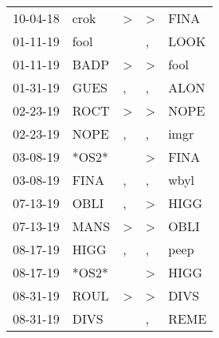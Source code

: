 \begin{supertabular}{p{0.07\textwidth}p{0.06\textwidth}p{0.02\textwidth}p{0.02\textwidth}p{0.06\textwidth}}
          10-04-18\textsuperscript{} &           crok\textsuperscript{} &     \textgreater &     \textgreater &           FINA\textsuperscript{} \\
          01-11-19\textsuperscript{} &           fool\textsuperscript{} &                  &                , &           LOOK\textsuperscript{} \\
          01-11-19\textsuperscript{} &           BADP\textsuperscript{} &     \textgreater &     \textgreater &           fool\textsuperscript{} \\
          01-31-19\textsuperscript{} &           GUES\textsuperscript{} &                , &                , &           ALON\textsuperscript{} \\
          02-23-19\textsuperscript{} &           ROCT\textsuperscript{} &     \textgreater &     \textgreater &           NOPE\textsuperscript{} \\
          02-23-19\textsuperscript{} &           NOPE\textsuperscript{} &                , &                , &           imgr\textsuperscript{} \\
          03-08-19\textsuperscript{} &                            *OS2* &                  &     \textgreater &           FINA\textsuperscript{} \\
          03-08-19\textsuperscript{} &           FINA\textsuperscript{} &                , &                , &           wbyl\textsuperscript{} \\
          07-13-19\textsuperscript{} &           OBLI\textsuperscript{} &                , &     \textgreater &           HIGG\textsuperscript{} \\
          07-13-19\textsuperscript{} &           MANS\textsuperscript{} &     \textgreater &     \textgreater &           OBLI\textsuperscript{} \\
          08-17-19\textsuperscript{} &           HIGG\textsuperscript{} &                , &                , &           peep\textsuperscript{} \\
          08-17-19\textsuperscript{} &                            *OS2* &                  &     \textgreater &           HIGG\textsuperscript{} \\
          08-31-19\textsuperscript{} &           ROUL\textsuperscript{} &     \textgreater &     \textgreater &           DIVS\textsuperscript{} \\
          08-31-19\textsuperscript{} &           DIVS\textsuperscript{} &                  &                , &           REME\textsuperscript{} \\

\end{supertabular}
